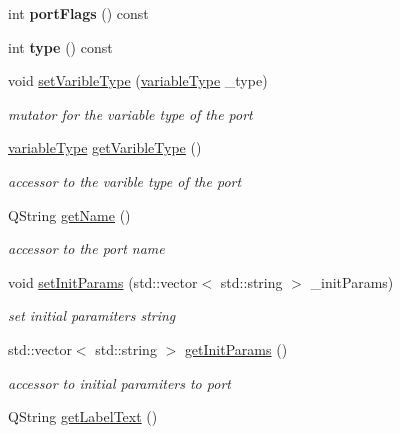 \begin{DoxyCompactItemize}
\item 
\hypertarget{class_q_n_e_port_af09c75fe08175fbcf4c152300ad35afb}{int {\bfseries port\-Flags} () const }\label{class_q_n_e_port_af09c75fe08175fbcf4c152300ad35afb}

\item 
\hypertarget{class_q_n_e_port_a2bd7ef43c6358d14e2edc1206cbc0349}{int {\bfseries type} () const }\label{class_q_n_e_port_a2bd7ef43c6358d14e2edc1206cbc0349}

\item 
void \hyperlink{class_q_n_e_port_aa8e18998a29ef7ec2d26143d6835d0cd}{set\-Varible\-Type} (\hyperlink{class_q_n_e_port_aeb3a8a2ac138252d1a0afc2c4f00438f}{variable\-Type} \-\_\-type)
\begin{DoxyCompactList}\small\item\em mutator for the variable type of the port \end{DoxyCompactList}\item 
\hyperlink{class_q_n_e_port_aeb3a8a2ac138252d1a0afc2c4f00438f}{variable\-Type} \hyperlink{class_q_n_e_port_a64115add3b4da6d58d287fe9530ca696}{get\-Varible\-Type} ()
\begin{DoxyCompactList}\small\item\em accessor to the varible type of the port \end{DoxyCompactList}\item 
Q\-String \hyperlink{class_q_n_e_port_afb0f6931a74eaaeee1975b21dc754051}{get\-Name} ()
\begin{DoxyCompactList}\small\item\em accessor to the port name \end{DoxyCompactList}\item 
void \hyperlink{class_q_n_e_port_af880fe558d12955f874b4f1eef5261b2}{set\-Init\-Params} (std\-::vector$<$ std\-::string $>$ \-\_\-init\-Params)
\begin{DoxyCompactList}\small\item\em set initial paramiters string \end{DoxyCompactList}\item 
\hypertarget{class_q_n_e_port_a43790ff1780c4efe01494e6b9182d21e}{std\-::vector$<$ std\-::string $>$ \hyperlink{class_q_n_e_port_a43790ff1780c4efe01494e6b9182d21e}{get\-Init\-Params} ()}\label{class_q_n_e_port_a43790ff1780c4efe01494e6b9182d21e}

\begin{DoxyCompactList}\small\item\em accessor to initial paramiters to port \end{DoxyCompactList}\item 
\hypertarget{class_q_n_e_port_aca918fc27382de55761b2b2045f4d9f4}{Q\-String \hyperlink{class_q_n_e_port_aca918fc27382de55761b2b2045f4d9f4}{get\-Label\-Text} ()}\label{class_q_n_e_port_aca918fc27382de55761b2b2045f4d9f4}


\end{DoxyCompactItemize}
